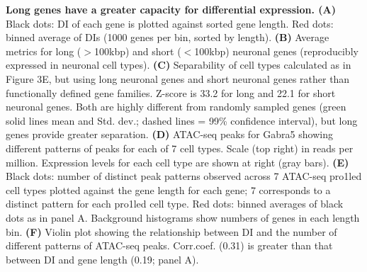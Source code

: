 \textbf{Long genes have a greater capacity for differential expression. (A)} Black dots: DI of each gene is plotted against sorted gene length. Red dots: binned average of DIs (1000 genes per bin, sorted by length). \textbf{(B)} Average metrics for long ($\gt$100kbp) and short ($\lt$100kbp) neuronal genes (reproducibly expressed in neuronal cell types). \textbf{(C)} Separability of cell types calculated as in Figure 3E, but using long neuronal genes and short neuronal genes rather than functionally defined gene families. Z-score is 33.2 for long and 22.1 for short neuronal genes. Both are highly different from randomly sampled genes (green solid lines mean and Std. dev.; dashed lines = 99\% confidence interval), but long genes provide greater separation. \textbf{(D)} ATAC-seq peaks for Gabra5 showing different patterns of peaks for each of 7 cell types. Scale (top right) in reads per million. Expression levels for each cell type are shown at right (gray bars). \textbf{(E)} Black dots: number of distinct peak patterns observed across 7 ATAC-seq pro1led cell types plotted against the gene length for each gene; 7 corresponds to a distinct pattern for each pro1led cell type. Red dots: binned averages of black dots as in panel A. Background histograms show numbers of genes in each length bin. \textbf{(F)} Violin plot showing the relationship between DI and the number of different patterns of ATAC-seq peaks. Corr.coef. (0.31) is greater than that between DI and gene length (0.19; panel A).  
